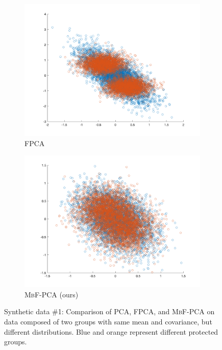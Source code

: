 \documentclass{beamer}
\begin{document}
\begin{frame}
\begin{figure}[!t]
\begin{center}
\begin{subfigure}[t]{0.24\linewidth}
				\includegraphics[width=\linewidth]{figures/exp1-1/fpca.png}
				\caption{\label{fig:FPCA} \textsc{FPCA} \cite{OA19}}
			\end{subfigure}\hfill
			\begin{subfigure}[t]{0.24\linewidth}
				\includegraphics[width=\linewidth]{figures/exp1-1/mbfpca.png}
				\caption{\label{fig:ours} \textsc{MbF-PCA} (ours)}
			\end{subfigure}
			\caption{\label{fig:exp1-1} Synthetic data \#1: Comparison of PCA, FPCA, and \textsc{MbF-PCA} on data composed of two groups with same mean and covariance, but different distributions. Blue and orange represent different protected groups.}
		\end{center}
	\end{figure}
\end{frame}
\end{document}
